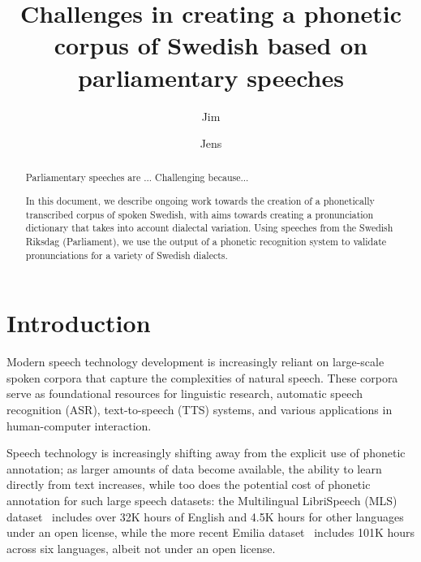 \documentclass{Interspeech}
\title{Challenges in creating a phonetic corpus of Swedish based on parliamentary speeches}
\author[affiliation={1}]{Jim}{O'Regan}
\author[affiliation={1}]{Jens}{Edlund}
\affiliation{Division of Speech, Music and Hearing}{KTH Royal Institute of Technology}{Sweden}
\begin{document}
\maketitle

\begin{abstract}
Parliamentary speeches are ...
Challenging because...

In this document, we describe ongoing work towards the creation of a phonetically transcribed corpus of spoken Swedish, with aims towards
creating a pronunciation dictionary that takes into account dialectal
variation. Using speeches from the Swedish Riksdag (Parliament), we use the output of a phonetic recognition system to validate pronunciations for a variety of Swedish dialects.
\end{abstract}




\section{Introduction}



Modern speech technology development is increasingly reliant on large-scale spoken corpora that capture the complexities of natural speech. These corpora serve as foundational resources for linguistic research, automatic speech recognition (ASR), text-to-speech (TTS) systems, and various applications in human-computer interaction. 

Speech technology is increasingly shifting away from the explicit use of phonetic annotation; as larger amounts of data become available, the ability to learn directly from text increases, while too does the potential cost of phonetic annotation for such large speech datasets: the Multilingual LibriSpeech (MLS) dataset~\cite{pratap20_interspeech} includes over 32K hours of English and 4.5K hours for other languages under an open license, while the more recent Emilia dataset~\cite{he2024emilia} includes 101K hours across six languages, albeit not under an open license.
\end{document}
